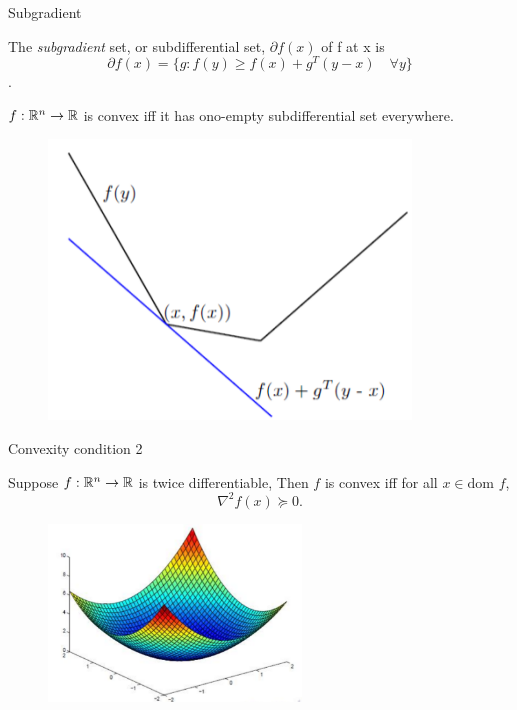 \documentclass[notes]{beamer}
\begin{document}
\begin{frame}{Subgradient}
	\begin{define}
		The \textit{subgradient} set, or subdifferential set, $\partial f(x)$ of f at x is $$\partial f(x) = \{ g: f(y) \ge f(x) +g^T(y-x) \quad \forall y\}$$.
	\end{define}

	\begin{minipage}{\textwidth}
		\begin{minipage}{.47\textwidth}
			\begin{thm}
				$f:{\mathbb{R}}^n\rightarrow {\mathbb{R}}$ is convex iff it has ono-empty subdifferential set everywhere.
			\end{thm}
		\end{minipage}
		\hfill
		\begin{minipage}{.47\textwidth}
			\begin{figure}
				\includegraphics[width=\textwidth]{2018-03-04-22-37-40.png}
			\end{figure}
		\end{minipage}
	\end{minipage}
\end{frame}
\begin{frame}{Convexity condition 2}
	\begin{thm}
		Suppose $f: {\mathbb{R}}^{n} \rightarrow {\mathbb{R}} $ is twice differentiable, Then $f$ is convex iff for all $x \in \text{dom } f $, \[\nabla^2f(x) \succeq 0. \]
	\end{thm}
	\begin{figure}
		\includegraphics[width=0.6\textwidth]{2018-03-05-10-37-24.png}
	\end{figure}
\end{frame}
\end{document}
